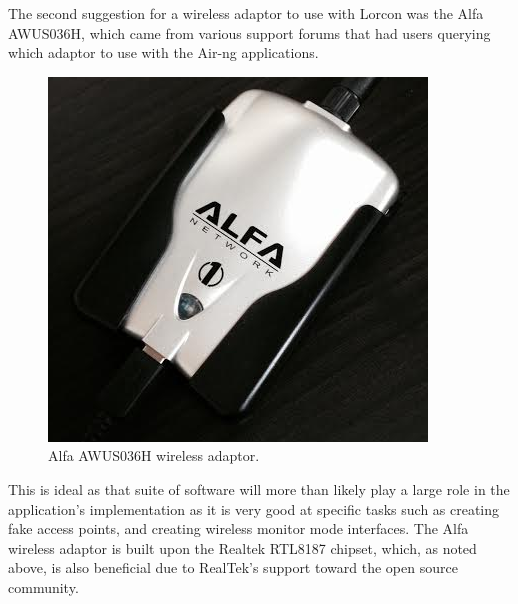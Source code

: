 The second suggestion for a wireless adaptor to use with Lorcon was the Alfa AWUS036H, which came from various support forums that had users querying which adaptor to use with the Air-ng applications.  

\begin{figure}[h!]
\centering\includegraphics{research/figures/alfa.png}
\caption{Alfa AWUS036H wireless adaptor.}
\label{research:fig-alfa}
\end{figure}
\newpage
This is ideal as that suite of software will more than likely play a large role in the application's implementation as it is very good at specific tasks such as creating fake access points, and creating wireless monitor mode interfaces. The Alfa wireless adaptor is built upon the Realtek RTL8187 chipset, which, as noted above, is also beneficial due to RealTek's support toward the open source community.